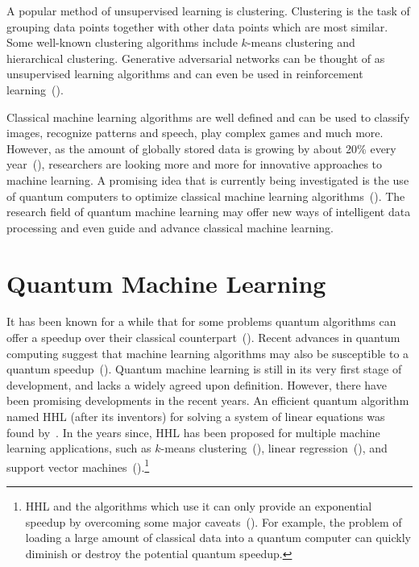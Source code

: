 \documentclass[a4paper,10pt]{article}
\begin{document}
A popular method of unsupervised learning is clustering.
Clustering is the task of grouping data points together with other data points which are most similar.
Some well-known clustering algorithms include $k$-means clustering and hierarchical clustering.
Generative adversarial networks can be thought of as unsupervised learning algorithms and can even be used in reinforcement learning~(\cite{ho2016generative}).

Classical machine learning algorithms are well defined and can be used to classify images, recognize patterns and speech, play complex games and much more.
However, as the amount of globally stored data is growing by about 20\% every year~(\cite{hilbert2011world}), researchers are looking more and more for innovative approaches to machine learning.
A promising idea that is currently being investigated is the use of quantum computers to optimize classical machine learning algorithms~(\cite{schuld2015introduction}).
The research field of quantum machine learning may offer new ways of intelligent data processing and even guide and advance classical machine learning.

\section{Quantum Machine Learning} \label{sec:quantum-ml}
It has been known for a while that for some problems quantum algorithms can offer a speedup over their classical counterpart~(\cite{nielsen-chuang}).
Recent advances in quantum computing suggest that machine learning algorithms may also be susceptible to a quantum speedup~(\cite{lee2019experimental, lloyd2013quantum, gao2018quantum, yoo2014quantum, biamonte2017quantum}).
Quantum machine learning is still in its very first stage of development, and lacks a widely agreed upon definition.
However, there have been promising developments in the recent years.
An efficient quantum algorithm named HHL (after its inventors) for solving a system of linear equations was found by~\cite{harrow2009quantum}.
In the years since, HHL has been proposed for multiple machine learning applications, such as $k$-means clustering~(\cite{lloyd2013quantum}), linear regression~(\cite{schuld2016prediction, yu2017improved, wang2017quantum}), and support vector machines~(\cite{rebentrost2014quantum}).\footnote{HHL and the algorithms which use it can only provide an exponential speedup by overcoming some major caveats~(\cite{aaronson2015read}). For example, the problem of loading a large amount of classical data into a quantum computer can quickly diminish or destroy the potential quantum speedup.}
\end{document}

